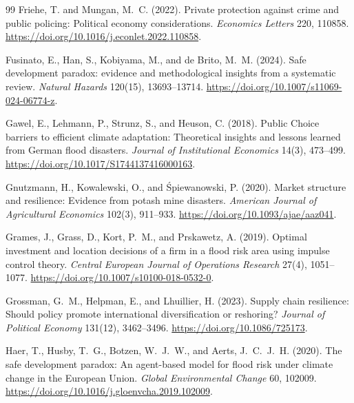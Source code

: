 \begin{thebibliography}{99}
Friehe, T. and Mungan, M.~C. (2022).
\newblock Private protection against crime and public policing: Political economy considerations.
\newblock \emph{Economics Letters} 220, 110858. \url{https://doi.org/10.1016/j.econlet.2022.110858}.

Fusinato, E., Han, S., Kobiyama, M., and de Brito, M.~M. (2024).
\newblock Safe development paradox: evidence and methodological insights from a systematic review.
\newblock \emph{Natural Hazards} 120(15), 13693--13714. \url{https://doi.org/10.1007/s11069-024-06774-z}.

Gawel, E., Lehmann, P., Strunz, S., and Heuson, C. (2018).
\newblock Public Choice barriers to efficient climate adaptation: Theoretical insights and lessons learned from German flood disasters.
\newblock \emph{Journal of Institutional Economics} 14(3), 473--499. \url{https://doi.org/10.1017/S1744137416000163}.

Gnutzmann, H., Kowalewski, O., and \'Spiewanowski, P. (2020).
\newblock Market structure and resilience: Evidence from potash mine disasters.
\newblock \emph{American Journal of Agricultural Economics} 102(3), 911--933. \url{https://doi.org/10.1093/ajae/aaz041}.

Grames, J., Grass, D., Kort, P.~M., and Prskawetz, A. (2019).
\newblock Optimal investment and location decisions of a firm in a flood risk area using impulse control theory.
\newblock \emph{Central European Journal of Operations Research} 27(4), 1051--1077. \url{https://doi.org/10.1007/s10100-018-0532-0}.

Grossman, G.~M., Helpman, E., and Lhuillier, H. (2023).
\newblock Supply chain resilience: Should policy promote international diversification or reshoring?
\newblock \emph{Journal of Political Economy} 131(12), 3462--3496. \url{https://doi.org/10.1086/725173}.

Haer, T., Husby, T.~G., Botzen, W.~J.~W., and Aerts, J.~C.~J.~H. (2020).
\newblock The safe development paradox: An agent-based model for flood risk under climate change in the European Union.
\newblock \emph{Global Environmental Change} 60, 102009. \url{https://doi.org/10.1016/j.gloenvcha.2019.102009}.


\end{thebibliography}
